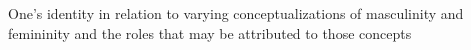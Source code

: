 One's identity in relation to varying conceptualizations of masculinity and femininity and the roles that may be attributed to those concepts
